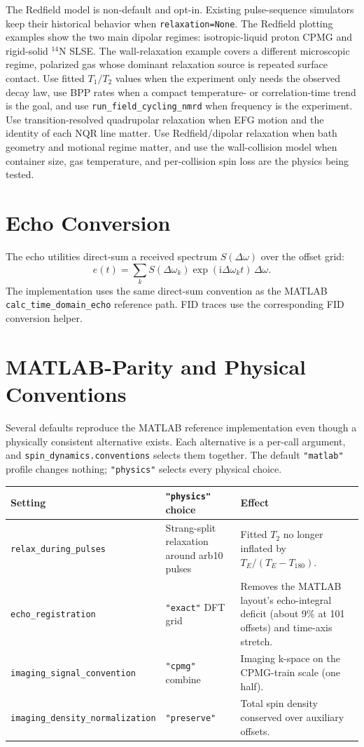 \documentclass[11pt,oneside]{report}
\newcommand{\code}[1]{\texttt{#1}}
\newcommand{\ii}{\mathrm{i}}
\begin{document}
The Redfield model is non-default and opt-in. Existing pulse-sequence
simulators keep their historical behavior when \code{relaxation=None}. The
Redfield plotting examples show the two main dipolar regimes: isotropic-liquid
proton CPMG and rigid-solid \({}^{14}\mathrm{N}\) SLSE. The wall-relaxation
example covers a different microscopic regime, polarized gas whose dominant
relaxation source is repeated surface contact.
Use fitted \(T_1/T_2\) values when the experiment only needs the observed decay
law, use BPP rates when a compact temperature- or correlation-time trend is the
goal, and use \code{run\_field\_cycling\_nmrd} when frequency is the experiment.
Use transition-resolved quadrupolar relaxation when EFG motion and the identity
of each NQR line matter. Use Redfield/dipolar relaxation when bath geometry and
motional regime matter, and use the wall-collision model when container size,
gas temperature, and per-collision spin loss are the physics being tested.

\section{Echo Conversion}

The echo utilities direct-sum a received spectrum \(S(\Delta\omega)\) over the
offset grid:
\[
  e(t) =
    \sum_k S(\Delta\omega_k)
    \exp(\ii \Delta\omega_k t)\,\Delta\omega .
\]
The implementation uses the same direct-sum convention as the MATLAB
\code{calc\_time\_domain\_echo} reference path. FID traces use the corresponding
FID conversion helper.

\section{MATLAB-Parity and Physical Conventions}

Several defaults reproduce the MATLAB reference implementation even though a
physically consistent alternative exists. Each alternative is a per-call
argument, and \code{spin\_dynamics.conventions} selects them together. The
default \code{"matlab"} profile changes nothing; \code{"physics"} selects every
physical choice.

\begin{center}
\small
\begin{tabular}{@{}p{} p{} p{}@{}}
\toprule
Setting & \code{"physics"} choice & Effect \\
\midrule
\code{relax\_during\_pulses} & Strang-split relaxation around arb10 pulses & Fitted $T_2$ no longer inflated by $T_E/(T_E-T_{180})$. \\
\code{echo\_registration} & \code{"exact"} DFT grid & Removes the MATLAB layout's echo-integral deficit (about 9\% at 101 offsets) and time-axis stretch. \\
\code{imaging\_signal\_convention} & \code{"cpmg"} combine & Imaging k-space on the CPMG-train scale (one half). \\
\code{imaging\_density\_normalization} & \code{"preserve"} & Total spin density conserved over auxiliary offsets. \\
\bottomrule
\end{tabular}
\end{center}
\end{document}
